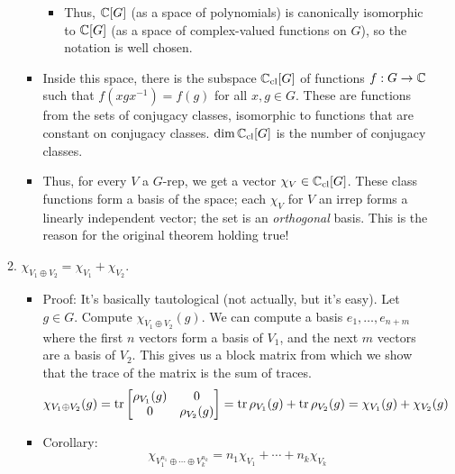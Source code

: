 \documentclass[../notes.tex]{subfiles}
\begin{document}
\begin{itemize}
\begin{enumerate}
\begin{itemize}
\begin{itemize}
\begin{itemize}
                \end{itemize}
                \item Thus, $\mathbb{C}[G]$ (as a space of polynomials) is canonically isomorphic to $\mathbb{C}[G]$ (as a space of complex-valued functions on $G$), so the notation is well chosen.
            \end{itemize}
            \item Inside this space, there is the subspace $\mathbb{C}_\text{cl}[G]$ of functions $f:G\to\mathbb{C}$ such that $f(xgx^{-1})=f(g)$ for all $x,g\in G$. These are functions from the sets of conjugacy classes, isomorphic to functions that are constant on conjugacy classes. $\dim\mathbb{C}_\text{cl}[G]$ is the number of conjugacy classes.
            \item Thus, for every $V$ a $G$-rep, we get a vector $\chi_V\in\mathbb{C}_\text{cl}[G]$. These class functions form a basis of the space; each $\chi_V$ for $V$ an irrep forms a linearly independent vector; the set is an \emph{orthogonal} basis. This is the reason for the original theorem holding true!
        \end{itemize}
        \item $\chi_{V_1\oplus V_2}=\chi_{V_1}+\chi_{V_2}$.
        \begin{itemize}
            \item Proof: It's basically tautological (not actually, but it's easy). Let $g\in G$. Compute $\chi_{V_1\oplus V_2}(g)$. We can compute a basis $e_1,\dots,e_{n+m}$ where the first $n$ vectors form a basis of $V_1$, and the next $m$ vectors are a basis of $V_2$. This gives us a block matrix from which we show that the trace of the matrix is the sum of traces.
            \begin{equation*}
                \chi_{V_1\oplus V_2}(g) = \tr
                \begin{bmatrix}
                    \rho_{V_1}(g) & 0\\
                    0 & \rho_{V_2}(g)\\
                \end{bmatrix}
                = \tr\rho_{V_1}(g)+\tr\rho_{V_2}(g)
                = \chi_{V_1}(g)+\chi_{V_2}(g)
            \end{equation*}
            \item Corollary:
            \begin{equation*}
                \chi_{V_1^{n_1}\oplus\cdots\oplus V_k^{n_k}} = n_1\chi_{V_1}+\cdots+n_k\chi_{V_k}
            \end{equation*}

\end{itemize}
\end{enumerate}
\end{itemize}
\end{document}
